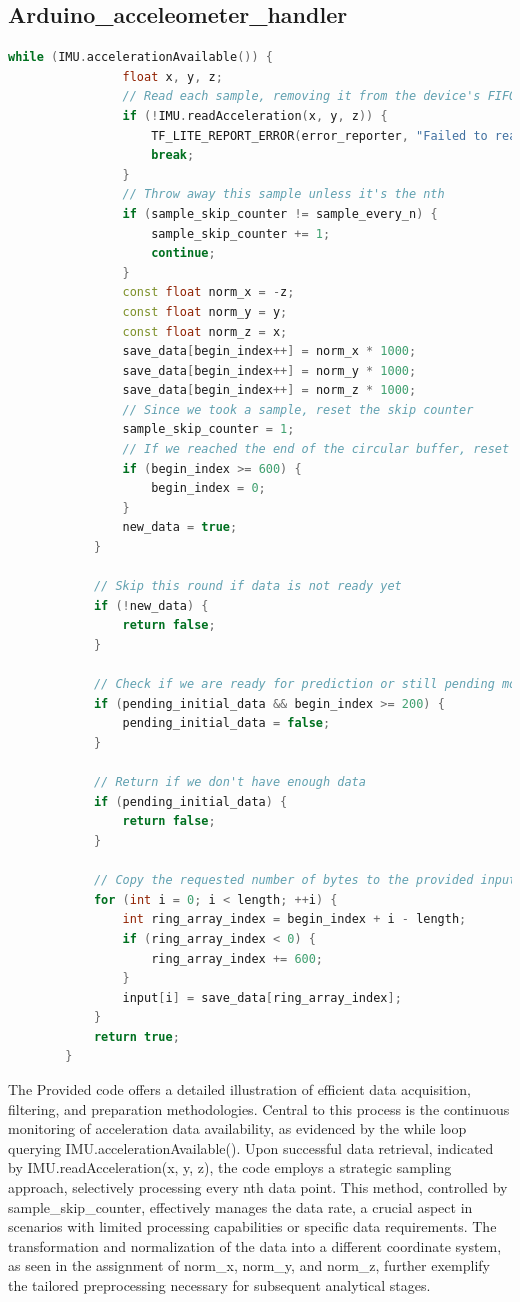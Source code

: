 		\subsection{Arduino\_acceleometer\_handler}
		\begin{lstlisting}[language=C++, caption={IMU Data Sampling and Buffer Management in C++}, label={code:imu-data-sampling}, style=bashstyle]
			while (IMU.accelerationAvailable()) {
				float x, y, z;
				// Read each sample, removing it from the device's FIFO buffer
				if (!IMU.readAcceleration(x, y, z)) {
					TF_LITE_REPORT_ERROR(error_reporter, "Failed to read data");
					break;
				}
				// Throw away this sample unless it's the nth
				if (sample_skip_counter != sample_every_n) {
					sample_skip_counter += 1;
					continue;
				}
				const float norm_x = -z;
				const float norm_y = y;
				const float norm_z = x;
				save_data[begin_index++] = norm_x * 1000;
				save_data[begin_index++] = norm_y * 1000;
				save_data[begin_index++] = norm_z * 1000;
				// Since we took a sample, reset the skip counter
				sample_skip_counter = 1;
				// If we reached the end of the circular buffer, reset
				if (begin_index >= 600) {
					begin_index = 0;
				}
				new_data = true;
			}
			
			// Skip this round if data is not ready yet
			if (!new_data) {
				return false;
			}
			
			// Check if we are ready for prediction or still pending more initial data
			if (pending_initial_data && begin_index >= 200) {
				pending_initial_data = false;
			}
			
			// Return if we don't have enough data
			if (pending_initial_data) {
				return false;
			}
			
			// Copy the requested number of bytes to the provided input tensor
			for (int i = 0; i < length; ++i) {
				int ring_array_index = begin_index + i - length;
				if (ring_array_index < 0) {
					ring_array_index += 600;
				}
				input[i] = save_data[ring_array_index];
			}
			return true;
		}
	\end{lstlisting}
	
	The Provided code offers a detailed illustration of efficient data acquisition, filtering, and preparation methodologies. Central to this process is the continuous monitoring of acceleration data availability, as evidenced by the while loop querying IMU.accelerationAvailable(). Upon successful data retrieval, indicated by IMU.readAcceleration(x, y, z), the code employs a strategic sampling approach, selectively processing every nth data point. This method, controlled by sample\_skip\_counter, effectively manages the data rate, a crucial aspect in scenarios with limited processing capabilities or specific data requirements. The transformation and normalization of the data into a different coordinate system, as seen in the assignment of norm\_x, norm\_y, and norm\_z, further exemplify the tailored preprocessing necessary for subsequent analytical stages.
	
